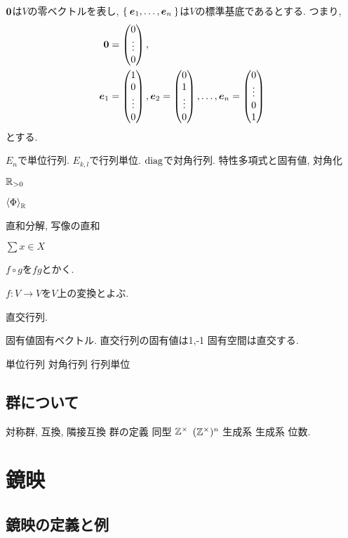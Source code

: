 $\boldsymbol{0}$は$V$の零ベクトルを表し,
$\Set{\boldsymbol{e}_1,\ldots,\boldsymbol{e}_n}$は$V$の標準基底であるとする.
つまり,
\begin{align*}
 \boldsymbol{0}&=\begin{pmatrix}0\\\vdots\\0\end{pmatrix},\\
 \boldsymbol{e}_1&=\begin{pmatrix}1\\0\\\vdots\\0\end{pmatrix},
 \boldsymbol{e}_2=\begin{pmatrix}0\\1\\\vdots\\0\end{pmatrix},
 \ldots,
 \boldsymbol{e}_n=\begin{pmatrix}0\\\vdots\\0\\1\end{pmatrix}
\end{align*}
とする.

$E_n$で単位行列.
$E_{k,l}$で行列単位.
$\operatorname{diag}$で対角行列.
特性多項式と固有値, 対角化

$\mathbb{R}_{>0}$

$\Braket{\Phi}_{\mathbb{R}}$

直和分解, 写像の直和

$\sum{x\in X}$

$f\circ g$を$fg$とかく.

$f\colon V\to V$を$V$上の変換とよぶ.

直交行列.

固有値固有ベクトル.
直交行列の固有値は1,-1
固有空間は直交する.

単位行列
対角行列
行列単位

\section{群について}
対称群, 互換, 隣接互換
群の定義
同型
$\mathbb{Z}^{\times}$ $(\mathbb{Z}^{\times})^n$ 生成系
生成系
位数.

\chapter{鏡映}

\section{鏡映の定義と例}


